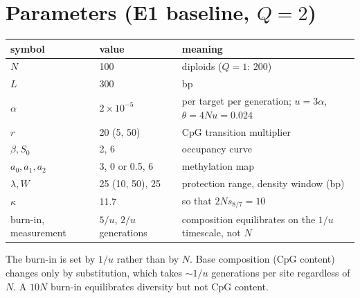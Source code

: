 \documentclass[11pt]{article}
\theoremstyle{definition}
\begin{document}
\section{Parameters (E1 baseline, $Q=2$)}
\begin{center}
\begin{tabular}{@{}lll@{}}
\toprule
symbol & value & meaning\\
\midrule
$N$ & 100 & diploids ($Q=1$: 200)\\
$L$ & 300 & bp\\
$\alpha$ & $2\times10^{-5}$ & per target per generation; $u=3\alpha$, $\theta=4Nu=0.024$\\
$r$ & 20 (5, 50) & CpG transition multiplier\\
$\beta,S_0$ & 2, 6 & occupancy curve\\
$a_0,a_1,a_2$ & 3, 0 or 0.5, 6 & methylation map\\
$\lambda,W$ & 25 (10, 50), 25 & protection range, density window (bp)\\
$\kappa$ & 11.7 & so that $2Ns_{8/7}=10$\\
burn-in, measurement & $5/u$, $2/u$ generations & composition equilibrates on the $1/u$ timescale, not $N$\\
\bottomrule
\end{tabular}
\end{center}
The burn-in is set by $1/u$ rather than by $N$. Base composition (CpG content) changes only by substitution, which
takes $\sim1/u$ generations per site regardless of $N$. A $10N$ burn-in equilibrates diversity but not CpG content.
\end{document}
